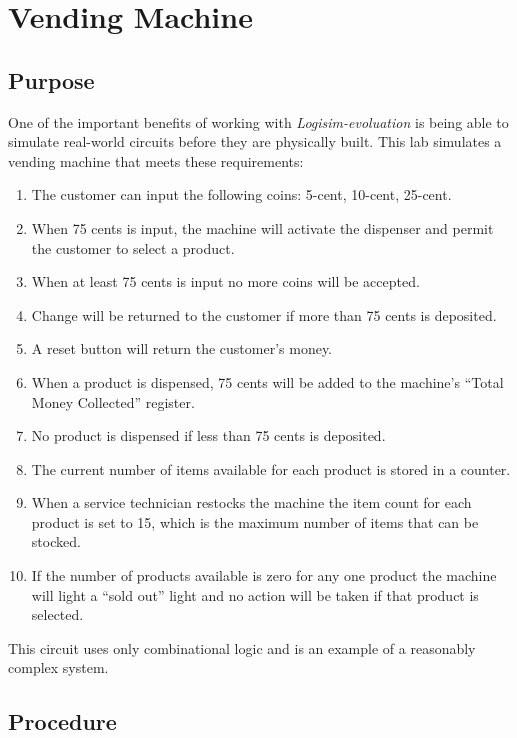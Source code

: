 \chapter{Vending Machine}

\section{Purpose}

One of the important benefits of working with \textit{Logisim-evoluation} is being able to simulate real-world circuits before they are physically built. This lab simulates a vending machine that meets these requirements:

\begin{enumerate}
	\item The customer can input the following coins: 5-cent, 10-cent, 25-cent.
	\item When 75 cents is input, the machine will activate the dispenser and permit the customer to select a product.
	\item When at least 75 cents is input no more coins will be accepted.
	\item Change will be returned to the customer if more than 75 cents is deposited.
	\item A reset button will return the customer's money.
	\item When a product is dispensed, 75 cents will be added to the machine's ``Total Money Collected'' register.
	\item No product is dispensed if less than 75 cents is deposited.
	\item The current number of items available for each product is stored in a counter.
	\item When a service technician restocks the machine the item count for each product is set to 15, which is the maximum number of items that can be stocked.
	\item If the number of products available is zero for any one product the machine will light a ``sold out'' light and no action will be taken if that product is selected.
\end{enumerate}

This circuit uses only combinational logic and is an example of a reasonably complex system. 

\section{Procedure}

